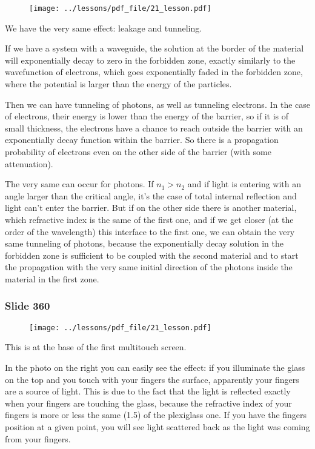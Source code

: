 \documentclass[../main/main.tex]{subfiles}
\begin{document}
\begin{figure}[h!]
\centering
\texttt{[image: ../lessons/pdf\_file/21\_lesson.pdf]}
\end{figure}

We have the very same effect: leakage and tunneling.

If we have a system with a waveguide, the solution at the border of the material will exponentially decay to zero in the forbidden zone, exactly similarly to the wavefunction of electrons, which goes exponentially faded in the forbidden zone, where the potential is larger than the energy of the particles.

Then we can have tunneling of photons, as well as tunneling electrons. In the case of electrons, their energy is lower than the energy of the barrier, so if it is of small thickness, the electrons have a chance to reach outside the barrier with an exponentially decay function within the barrier. So there is a propagation probability of electrons even on the other side of the barrier (with some attenuation).

The very same can occur for photons. If $n_1 > n_2$ and if light is entering with an angle larger than the critical angle, it’s the case of total internal reflection and light can’t enter the barrier.
But if on the other side there is another material, which refractive index is the same of the first one, and if we get closer (at the order of the wavelength) this interface to the first one, we can obtain the very same tunneling of photons, because the exponentially decay solution in the forbidden zone is sufficient to be coupled with the second material and to start the propagation with the very same initial direction of the photons inside the material in the first zone.

\newpage

\subsubsection{Slide 360}

\begin{figure}[h!]
\centering
\texttt{[image: ../lessons/pdf\_file/21\_lesson.pdf]}
\end{figure}

This is at the base of the first multitouch screen.

In the photo on the right you can easily see the effect: if you illuminate the glass on the top and you touch with your fingers the surface, apparently your fingers are a source of light. This is due to the fact that the light is reflected exactly when your fingers are touching the glass, because the refractive index of your fingers is more or less the same (1.5) of the plexiglass one.
If you have the fingers position at a given point, you will see light scattered back as the light was coming from your fingers.
\end{document}
